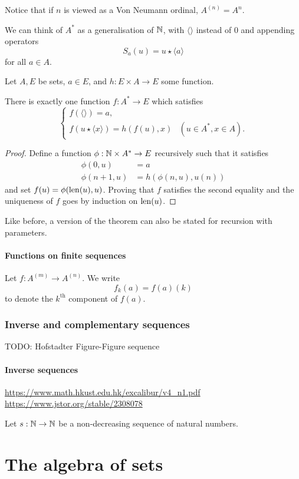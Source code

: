 Notice that if $n$ is viewed as a Von Neumann ordinal, $A^{(n)} = A^n$.

We can think of $A^*$ as a generalisation of $\mathbb{N}$, with $\langle\rangle$ instead of $0$ and appending operators
\[ S_a(u) = u\star \langle a\rangle \]
for all $a\in A$.
\begin{theorem}
Let $A,E$ be sets, $a\in E$, and $h:E\times A\to E$ some function.

There is exactly one function $f: A^*\to E$ which satisfies
\[ \begin{cases}
f(\langle\rangle) = a, \\
f(u\star \langle x\rangle) = h(f(u), x) & (u\in A^*, x\in A).
\end{cases} \]
\end{theorem}
\begin{proof}
Define a function $\phi: \mathbb{N} \times A^*\to E$ recursively such that it satisfies
\begin{align*}
\phi(0,u) &= a \\
\phi(n+1,u) &= h(\phi(n,u), u(n))
\end{align*}
and set $f(u) = \phi(\operatorname{len}(u), u)$. Proving that $f$ satisfies the second equality and the uniqueness of $f$ goes by induction on $\operatorname{len}(u)$.
\end{proof}
Like before, a version of the theorem can also be stated for recursion with parameters.
\subsubsection{Functions on finite sequences}
Let $f: A^{(m)}\to A^{(n)}$. We write
\[ f_k(a) = f(a)(k) \]
to denote the $k^\text{th}$ component of $f(a)$.

\subsection{Inverse and complementary sequences}
TODO: Hofstadter Figure-Figure sequence
\subsubsection{Inverse sequences}
\url{https://www.math.hkust.edu.hk/excalibur/v4_n1.pdf}
\url{https://www.jstor.org/stable/2308078}
\begin{definition}
Let $s:\mathbb{N}\to\mathbb{N}$ be a non-decreasing sequence of natural numbers.
\end{definition}


\chapter{The algebra of sets}
